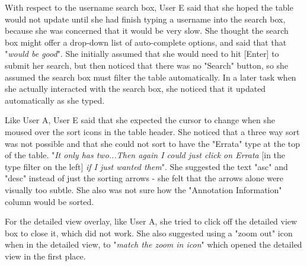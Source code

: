 With respect to the username search box, User E said that she hoped the table would not update until she had finish typing a username into the search box, because she was concerned that it would be very slow. She thought the search box might offer a drop-down list of auto-complete options, and said that that "\textit{would be good}". She initially assumed that she would need to hit [Enter] to submit her search, but then noticed that there was no "Search" button, so she assumed the search box must filter the table automatically. In a later task when she actually interacted with the search box, she noticed that it updated automatically as she typed. 

Like User A, User E said that she expected the cursor to change when she moused over the sort icons in the table header. She noticed that a three way sort was not possible and that she could not sort to have the "Errata" type at the top of the table. "\textit{It only has two...Then again I could just click on Errata} [in the type filter on the left] \textit{if I just wanted them}". She suggested the text "asc" and "desc" instead of just the sorting arrows - she felt that the arrows alone were visually too subtle. She also was not sure how the "Annotation Information" column would be sorted. 

For the detailed view overlay, like User A, she tried to click off the detailed view box to close it, which did not work. She also suggested using a "zoom out" icon when in the detailed view, to "\textit{match the zoom in icon}" which opened the detailed view in the first place. 

